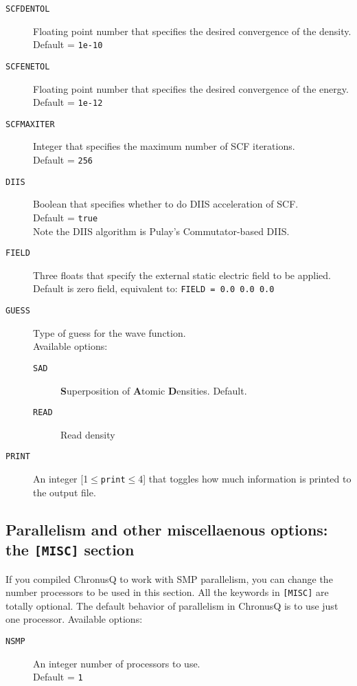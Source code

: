 \documentclass[12pt]{article}
\begin{document}
     \begin{description}
       \item[\texttt{SCFDENTOL}] Floating point number that specifies the desired convergence of the density. \\
        Default = \texttt{1e-10} 
       \item[\texttt{SCFENETOL}] Floating point number that specifies the desired convergence of the energy. \\
        Default = \texttt{1e-12}
       \item[\texttt{SCFMAXITER}] Integer that specifies the maximum number of SCF iterations. \\
        Default = \texttt{256}
       \item[\texttt{DIIS}] Boolean that specifies whether to do DIIS acceleration of SCF. \\
        Default = \texttt{true} \\
        Note the DIIS algorithm is Pulay's Commutator-based DIIS.
       \item[\texttt{FIELD}] Three floats that specify the external static electric field to be applied. \\
       Default is zero field, equivalent to: \texttt{FIELD = 0.0 0.0 0.0}
       \item[\texttt{GUESS}] Type of guess for the wave function. \\
       Available options: 
         \begin{description}
           \item[\texttt{SAD}] \textbf{S}uperposition of \textbf{A}tomic \textbf{D}ensities. Default.
           \item[\texttt{READ}] Read density 
         \end{description}
       \item[\texttt{PRINT}] An integer [1$\leq$\texttt{print}$\leq$4] that toggles how much information is printed to the output file.
         
     \end{description}

    \subsection{Parallelism and other miscellaenous options: the \texttt{[MISC]} section}
     If you compiled ChronusQ to work with SMP parallelism, you can change the number processors to be used in this section. All the keywords in \texttt{[MISC]} are totally optional. The default behavior of parallelism in ChronusQ is to use just one processor.
     Available options:
     \begin{description}
     \item[\texttt{NSMP}] An integer number of processors to use. \\
     Default = \texttt{1}
     \end{description}
\end{document}
